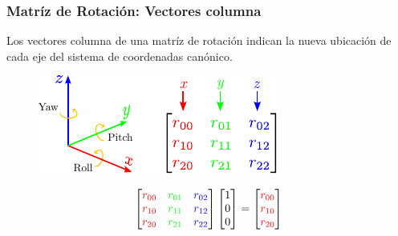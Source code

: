 \begin{frame}
    \frametitle{Matríz de Rotación: Vectores columna}

    Los vectores columna de una matríz de rotación indican la nueva ubicación de cada eje del sistema de coordenadas canónico.

    \begin{figure}[!h]
        \includegraphics[width=0.5\columnwidth]{./images/rotation_matrix_column_vectors.pdf}
    \end{figure}

    \begin{equation*}
        \begin{bmatrix}
            \textcolor{red}{r_{00}} & \textcolor{green}{r_{01}} & \textcolor{blue}{r_{02}}\\
            \textcolor{red}{r_{10}} & \textcolor{green}{r_{11}} & \textcolor{blue}{r_{12}}\\
            \textcolor{red}{r_{20}} & \textcolor{green}{r_{21}} & \textcolor{blue}{r_{22}}
        \end{bmatrix}
        \begin{bmatrix}
            1\\
            0\\
            0
        \end{bmatrix} =
        \begin{bmatrix}
            \textcolor{red}{r_{00}}\\
            \textcolor{red}{r_{10}}\\
            \textcolor{red}{r_{20}}
        \end{bmatrix}
    \end{equation*}

\end{frame}



